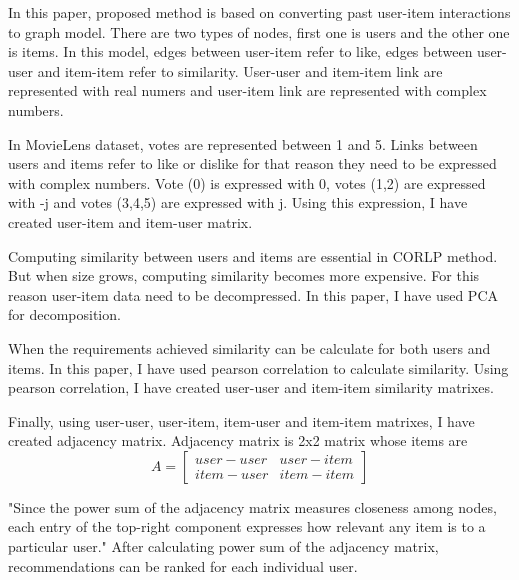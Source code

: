 In this paper, proposed method is based on converting past user-item interactions to graph model. There are two types of nodes, first one is users and the other one is items. In this model, edges between user-item refer to like, edges between user-user and item-item refer to similarity. User-user and item-item link are represented with real numers and user-item link are represented with complex numbers.\cite{xie2015link}

In MovieLens dataset, votes are represented between 1 and 5. Links between users and items refer to like or dislike for that reason they need to be expressed with complex numbers. Vote  (0) is expressed with 0, votes (1,2) are expressed with -j and votes (3,4,5) are expressed with j.\cite{xie2015link} Using this expression, I have created user-item and item-user matrix.

Computing similarity between users and items are essential in \ac{CORLP} method. But when size grows, computing similarity becomes more expensive. For this reason user-item data need to be decompressed. In this paper, I have used \ac{PCA} for decomposition.

When the requirements achieved similarity can be calculate for both users and items. In this paper, I have used pearson correlation to calculate similarity. Using pearson correlation, I have created user-user and item-item similarity matrixes.

Finally, using user-user, user-item, item-user and item-item matrixes, I have created adjacency matrix. Adjacency matrix is 2x2 matrix whose items are
\[
A=
  \begin{bmatrix}
    user-user & user-item \\
    item-user & item-item
  \end{bmatrix}
\]

"Since the power sum of the adjacency matrix measures closeness among nodes, each entry of the top-right component expresses how relevant any item is to a particular user."\cite{xie2015link} After calculating power sum of the adjacency matrix, recommendations can be ranked for each individual user.